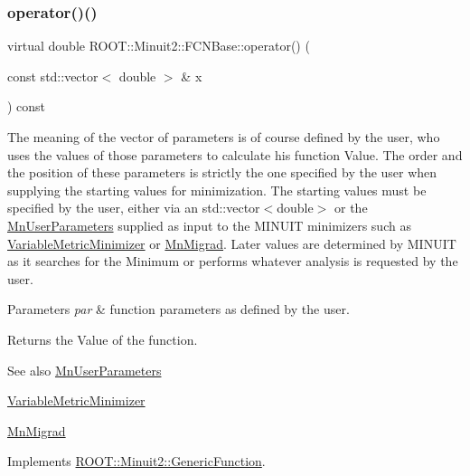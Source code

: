\subsubsection{\texorpdfstring{operator()()}{operator()()}\hspace{0.1cm}{\footnotesize\ttfamily [3/3]}}
{\footnotesize\ttfamily virtual double R\+O\+O\+T\+::\+Minuit2\+::\+F\+C\+N\+Base\+::operator() (\begin{DoxyParamCaption}\item[{const std\+::vector$<$ double $>$ \&}]{x }\end{DoxyParamCaption}) const\hspace{0.3cm}{\ttfamily [pure virtual]}}

The meaning of the vector of parameters is of course defined by the user, who uses the values of those parameters to calculate his function Value. The order and the position of these parameters is strictly the one specified by the user when supplying the starting values for minimization. The starting values must be specified by the user, either via an std\+::vector$<$double$>$ or the \mbox{\hyperlink{classROOT_1_1Minuit2_1_1MnUserParameters}{Mn\+User\+Parameters}} supplied as input to the M\+I\+N\+U\+IT minimizers such as \mbox{\hyperlink{classROOT_1_1Minuit2_1_1VariableMetricMinimizer}{Variable\+Metric\+Minimizer}} or \mbox{\hyperlink{classROOT_1_1Minuit2_1_1MnMigrad}{Mn\+Migrad}}. Later values are determined by M\+I\+N\+U\+IT as it searches for the Minimum or performs whatever analysis is requested by the user.


\begin{DoxyParams}{Parameters}
{\em par} & function parameters as defined by the user.\\
\hline
\end{DoxyParams}
\begin{DoxyReturn}{Returns}
the Value of the function.
\end{DoxyReturn}
\begin{DoxySeeAlso}{See also}
\mbox{\hyperlink{classROOT_1_1Minuit2_1_1MnUserParameters}{Mn\+User\+Parameters}} 

\mbox{\hyperlink{classROOT_1_1Minuit2_1_1VariableMetricMinimizer}{Variable\+Metric\+Minimizer}} 

\mbox{\hyperlink{classROOT_1_1Minuit2_1_1MnMigrad}{Mn\+Migrad}} 
\end{DoxySeeAlso}


Implements \mbox{\hyperlink{classROOT_1_1Minuit2_1_1GenericFunction_a0d6039ad9aa18e475534d1fd80342e9d}{R\+O\+O\+T\+::\+Minuit2\+::\+Generic\+Function}}.



